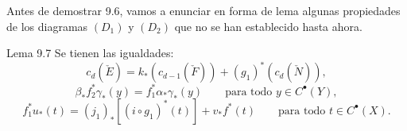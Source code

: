 Antes de demostrar 9.6, vamos a enunciar en forma de lema algunas propiedades de los diagramas $(D_1)$ y $(D_2)$ que no se han establecido hasta ahora.

\begin{statement}{Lema 9.7}
Se tienen las igualdades:
\[
c_d(\check E)=k_*(c_{d-1}(\check F))+(g_1)^*(c_d(\check N)),
\tag{9.7 i}
\]
\[
\beta_*f_2^*\gamma_*(y)=f_1^*\alpha_*\gamma_*(y)\qquad\text{para todo }y\in C^{\bullet}(Y),
\tag{9.7 ii}
\]
\[
f_1^*u_*(t)=(j_1)_*[(i\circ g_1)^*(t)]+v_*f^*(t)\qquad\text{para todo }t\in C^{\bullet}(X).
\tag{9.7 iii}
\]
\end{statement}
